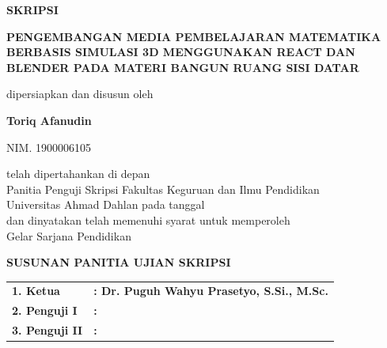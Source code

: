 \newpage
\thispagestyle{empty}

\begin{center}
    {
        \fontsize{16pt}{18pt}\selectfont
        \textbf{SKRIPSI}
    }
    
    \vspace{0.3cm}
    
    {
        \fontsize{14pt}{16pt}\selectfont
        \textbf{PENGEMBANGAN MEDIA PEMBELAJARAN MATEMATIKA BERBASIS SIMULASI 3D MENGGUNAKAN REACT DAN BLENDER PADA MATERI BANGUN RUANG SISI DATAR}
    }
    
    \vspace{0.5cm}
    
    {\fontsize{12pt}{14pt}\selectfont
        dipersiapkan dan disusun oleh}
    
    \vspace{0.3cm}
    
    {\fontsize{14pt}{16pt}\selectfont
        \textbf{Toriq Afanudin}}
    
    \vspace{0.2cm}
    
    {\fontsize{12pt}{14pt}\selectfont
        NIM. 1900006105}
    
    \vspace{0.5cm}
    
    {\fontsize{12pt}{14pt}\selectfont
        telah dipertahankan di depan\\
        Panitia Penguji Skripsi Fakultas Keguruan dan Ilmu Pendidikan\\
        Universitas Ahmad Dahlan pada tanggal \dotfill \\
        dan dinyatakan telah memenuhi syarat untuk memperoleh\\
        Gelar Sarjana Pendidikan}
    
    \vspace{0.5cm}
    
    {
        \fontsize{14pt}{16pt}\selectfont
        \textbf{SUSUNAN PANITIA UJIAN SKRIPSI}
    }
\end{center}

\vspace{0.3cm}

\noindent
\begin{tabularx}{\textwidth}{lX}
    \textbf{1. Ketua}      & \textbf{: Dr. Puguh Wahyu Prasetyo, S.Si., M.Sc.} \\
    \textbf{2. Penguji I}  & \textbf{: \dotfill} \\
    \textbf{3. Penguji II} & \textbf{: \dotfill}
\end{tabularx}

